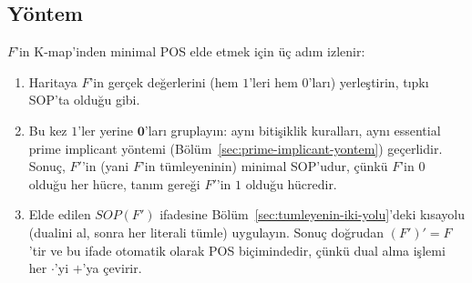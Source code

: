 \subsection{Yöntem}\label{sec:pos-yontem}
$F$'in K-map'inden minimal POS elde etmek için üç adım izlenir:
\begin{enumerate}[nosep, leftmargin=*]
    \item Haritaya $F$'in gerçek değerlerini (hem $1$'leri hem $0$'ları) yerleştirin,
    tıpkı SOP'ta olduğu gibi.
    \item Bu kez $1$'ler yerine $\mathbf{0}$'ları gruplayın: aynı bitişiklik kuralları,
    aynı essential prime implicant yöntemi (Bölüm~\ref{sec:prime-implicant-yontem})
    geçerlidir. Sonuç, $F'$'in (yani $F$'in tümleyeninin) minimal SOP'udur, çünkü
    $F$'in $0$ olduğu her hücre, tanım gereği $F'$'in $1$ olduğu hücredir.
    \item Elde edilen $SOP(F')$ ifadesine Bölüm~\ref{sec:tumleyenin-iki-yolu}'deki
    kısayolu (dualini al, sonra her literali tümle) uygulayın. Sonuç doğrudan
    $(F')'=F$'tir ve bu ifade otomatik olarak POS biçimindedir, çünkü dual alma işlemi
    her $\cdot$'yi $+$'ya çevirir.
\end{enumerate}

